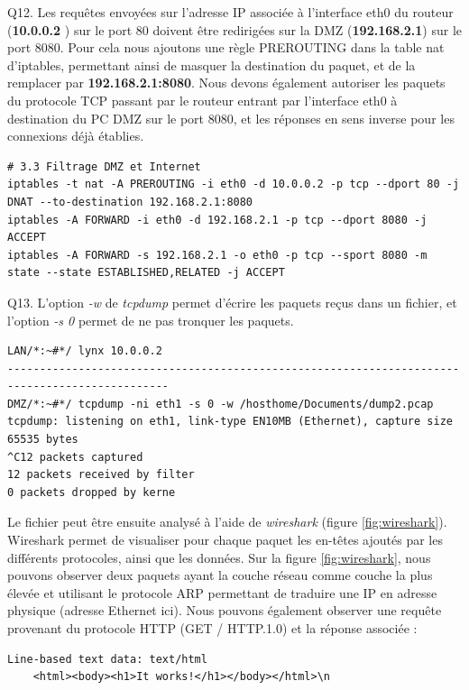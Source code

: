 \documentclass[frenchb, 11pt]{article}
\newlength{\leftbarwidth}
\newlength{\leftbarsep}
\newcommand*{\leftbarcolorcmd}{\color{leftbarcolor}} %
\renewenvironment{leftbar}{%
    \def\FrameCommand{{\leftbarcolorcmd{\vrule width \leftbarwidth\relax\hspace {\leftbarsep}}}}%
    \MakeFramed {\advance \hsize -\width \FrameRestore }%
}{%
    \endMakeFramed
}
\begin{document}
\begin{leftbar}
	\noindent Q12. Les requêtes envoyées sur l'adresse IP associée à l'interface eth0 du routeur (\textbf{10.0.0.2} ) sur le port 80 doivent être redirigées sur la DMZ (\textbf{192.168.2.1}) sur le port 8080. Pour cela nous ajoutons une règle PREROUTING dans la table nat d'iptables, permettant ainsi de masquer la destination du paquet, et de la remplacer par \textbf{192.168.2.1:8080}. Nous devons également autoriser les paquets du protocole TCP passant par le routeur entrant par l'interface eth0 à destination du PC DMZ sur le port 8080, et les réponses en sens inverse pour les connexions déjà établies.
	\begin{lstlisting}[numbers=none]
# 3.3 Filtrage DMZ et Internet
iptables -t nat -A PREROUTING -i eth0 -d 10.0.0.2 -p tcp --dport 80 -j DNAT --to-destination 192.168.2.1:8080
iptables -A FORWARD -i eth0 -d 192.168.2.1 -p tcp --dport 8080 -j ACCEPT
iptables -A FORWARD -s 192.168.2.1 -o eth0 -p tcp --sport 8080 -m state --state ESTABLISHED,RELATED -j ACCEPT
	\end{lstlisting}
\end{leftbar}

\begin{leftbar}
	\noindent Q13. L'option \emph{-w} de \emph{tcpdump} permet d'écrire les paquets reçus dans un fichier, et l'option \emph{-s 0} permet de ne pas tronquer les paquets.
	\begin{lstlisting}[numbers=none]
LAN/*:~#*/ lynx 10.0.0.2
-----------------------------------------------------------------------------------------------
DMZ/*:~#*/ tcpdump -ni eth1 -s 0 -w /hosthome/Documents/dump2.pcap
tcpdump: listening on eth1, link-type EN10MB (Ethernet), capture size 65535 bytes
^C12 packets captured
12 packets received by filter
0 packets dropped by kerne
	\end{lstlisting}
	Le fichier peut être ensuite analysé à l'aide de \emph{wireshark} (figure \ref{fig:wireshark}). Wireshark permet de visualiser pour chaque paquet les en-têtes ajoutés par les différents protocoles, ainsi que les données. Sur la figure \ref{fig:wireshark}, nous pouvons observer deux paquets ayant la couche réseau comme couche la plus élevée et utilisant le protocole ARP permettant de traduire une IP en adresse physique (adresse Ethernet ici). Nous pouvons également observer une requête provenant du protocole HTTP (GET / HTTP.1.0) et la réponse associée :
	\begin{lstlisting}[numbers=none]
Line-based text data: text/html
	<html><body><h1>It works!</h1></body></html>\n
	\end{lstlisting}
\end{leftbar}
\end{document}
